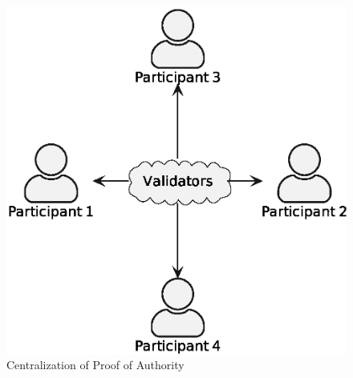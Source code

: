\begin{figure}[h]
    \centering
    \includegraphics[scale=0.5]{img/proof-of-authority-0}
    \caption{Centralization of Proof of Authority}
    \label{fig:centralization-of-proof-of-authority}
\end{figure}

